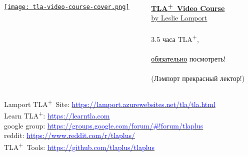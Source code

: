 \documentclass[
  11pt,aspectratio=169,pdf,hyperref={unicode,colorlinks=false}
]{beamer}
\def\TLA{TLA\textsuperscript{+}}
\begin{document}
\begin{frame}[c]
  \begin{columns}
    \begin{column}{.47\textwidth}
      \begin{minipage}[c][0.75\textheight][c]{\columnwidth}
      \centering%
      \href{http://lamport.azurewebsites.net/video/videos.html}{%
        \texttt{[image: tla-video-course-cover.png]}
      }%
      \end{minipage}%
    \end{column}
    \begin{column}{.47\textwidth}
      \begin{minipage}[c][0.75\textheight][s]{\columnwidth}
      \href{http://lamport.azurewebsites.net/video/videos.html}{%
        {\Large\bf \TLA\ Video Course}\\
        {\normalsize by Leslie Lamport}
      }\\
      \\
      \large%
      3.5 часа \TLA,\\
      \\%
      \underline{обязательно} посмотреть!\\
      \\%
      (Лэмпорт прекрасный лектор!)\\
      \vfill
      \href{http://lamport.azurewebsites.net/video/videos.html}{%
      }
      \end{minipage}
    \end{column}
  \end{columns}
\end{frame}

\begin{frame}[c]
  \centering\large%
  \vfill%
  \begin{beamercolorbox}{}
    Lamport \TLA\ Site: \href{https://lamport.azurewebsites.net/tla/tla.html}{\textcolor{blue}{https://lamport.azurewebsites.net/tla/tla.html}}\\[2ex]
    Learn \TLA: \href{https://learntla.com/}{\textcolor{blue}{https://learntla.com}}\\[2ex]
    google group: \href{https://groups.google.com/forum/\#!forum/tlaplus}{\textcolor{blue}{https://groups.google.com/forum/\#!forum/tlaplus}}\\[2ex]
    reddit: \href{https://www.reddit.com/r/tlaplus/}{\textcolor{blue}{https://www.reddit.com/r/tlaplus/}}\\[2ex]
    \TLA\ Tools: \href{https://github.com/tlaplus/tlaplus}{\textcolor{blue}{https://github.com/tlaplus/tlaplus}}
  \end{beamercolorbox}
  \vfill%
\end{frame}
\end{document}
